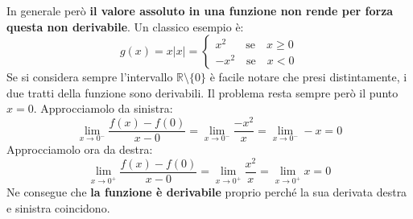 In generale però \textbf{il valore assoluto in una funzione non rende per forza 
questa non derivabile}. Un classico esempio è:
\begin{equation*}
	g(x) = x|x| = 
	\begin{cases*}
		x^2 \quad \;\;\, \text{se} \quad x \geq 0\\
		-x^2 \quad \text{se} \quad x < 0
	\end{cases*}
\end{equation*}
Se si considera sempre l'intervallo $\mathbb{R} \setminus \{0\}$ è facile 
notare che presi distintamente, i due tratti della funzione sono derivabili. 
Il problema resta sempre però il punto $x = 0$. Approcciamolo da sinistra:
\begin{equation*}
	\lim_{x \to 0^-} \dfrac{f(x) - f(0)}{x - 0} = \lim_{x \to 0^-} 
    \dfrac{-x^2}{x} = \lim_{x \to 0^-} -x = 0
\end{equation*}
Approcciamolo ora da destra:
\begin{equation*}
	\lim_{x \to 0^+} \dfrac{f(x) - f(0)}{x - 0} = \lim_{x \to 0^+} 
    \dfrac{x^2}{x} = \lim_{x \to 0^+} x = 0
\end{equation*}
Ne consegue che \textbf{la funzione è derivabile} proprio perché la sua 
derivata destra e sinistra coincidono.

